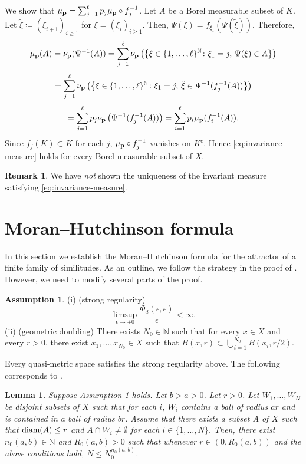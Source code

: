 \documentclass[a4paper, reqno, 11pt]{amsart}
\newtheorem{Lem}[Thm]{Lemma}
\theoremstyle{definition}
\newtheorem{Ass}[Thm]{Assumption}
\newtheorem{Rem}[Thm]{Remark}
\begin{document}
We show that $\mu_{\bf p} = \sum_{j = 1}^{\ell} p_j \mu_{\bf p} \circ f_{j}^{-1}$. 
Let $A$ be a Borel measurable subset of $K$. 
Let $\tilde{\xi} \coloneqq (\xi_{i+1})_{i \ge 1}$ for $\xi = (\xi_i)_{i \ge 1}$.  
Then, $\Psi(\xi) = f_{\xi_1}\left(\Psi (\tilde{\xi}) \right)$.  
Therefore, 
\[ \mu_{\bf p} (A) = \nu_{\bf p}  (\Psi^{-1}(A)) = \sum_{j = 1}^{\ell} \nu_{\bf p}  \left(  \left\{\xi \in \{1, \dots, \ell\}^{\mathbb N}  \colon \xi_1 = j, \, \Psi(\xi) \in A \right\} \right)  \] 
\[ = \sum_{j = 1}^{\ell} \nu_{\bf p}  \left( \left\{\xi  \in \{1, \dots, \ell\}^{\mathbb N} \colon \xi_1 = j, \, \tilde{\xi} \in \Psi^{-1}(f_j^{-1}(A)) \right\}  \right) \]
\[ = \sum_{j = 1}^{\ell} p_j \nu_{\bf p}  \left(\Psi^{-1}(f_j^{-1}(A))  \right) =  \sum_{i=1}^{\ell} p_i \mu_{\bf p} (f_i^{-1} (A)).  \]
Since $f_j (K) \subset K$ for each $j$, $\mu_{\bf p} \circ f_j^{-1}$ vanishes on $K^c$. 
Hence \eqref{eq:invariance-measure} holds for every Borel measurable subset of $X$. 

\begin{Rem}
We have {\it not} shown the uniqueness of the invariant measure satisfying \eqref{eq:invariance-measure}. 
\end{Rem}



\section{Moran--Hutchinson formula}\label{sec:MH-formula}

In this section we establish the Moran--Hutchinson formula for the attractor of a finite family of similitudes. 
As an outline, we follow the strategy in the proof of  \cite[Theorem 2.2.2]{BishopPeres2017}. 
However, we need to modify several parts of the proof.  


\begin{Ass}\label{ass:two-additional-metric}
(i) (strong regularity)
\[ \limsup_{\epsilon \to +0} \frac{\Phi_d (\epsilon, \epsilon)}{\epsilon} < \infty.  \]
(ii) (geometric doubling)
There exists $N_0 \in \mathbb{N}$ such that for every $x \in X$ and every $r > 0$, there exist $x_1, \dots, x_{N_0} \in X$ such that $B(x,r) \subset \bigcup_{i=1}^{N_0} B(x_i, r/2)$. 
\end{Ass}

Every quasi-metric space satisfies the strong regularity above. 
The following corresponds to \cite[Lemma 3.3]{BaloghRohner2007}. 

\begin{Lem}\label{lem:number-disjoint}
Suppose Assumption \ref{ass:two-additional-metric} holds. 
Let $b > a > 0$. 
Let $r > 0$. 
Let $W_1, \dots, W_N$ be disjoint subsets of $X$ such that for each $i$, $W_i$ contains a ball of radius $ar$ and is contained in a ball of radius $br$. 
Assume that there exists a subset $A$ of $X$ such that  
$\textup{diam}(A) \le r$ and $A \cap W_i \ne \emptyset$ for each $i \in \{1, \dots, N\}$. 
Then, there exist  $n_0 (a,b) \in \mathbb{N}$ and $R_0 (a,b) > 0$ such that whenever $r \in (0, R_0 (a,b))$ and the above conditions hold, $N \le N_0^{n_0 (a,b)}$. 
\end{Lem}
\end{document}
